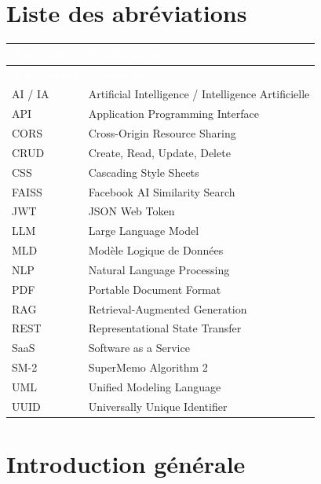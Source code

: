 \documentclass[12pt, a4paper, oneside]{report}
\newcommand{\thead}[1]{\textcolor{white}{\textbf{#1}}}
\begin{document}
\chapter*{Liste des abréviations}
\begin{longtable}{@{}ll@{}}
\toprule
\rowcolor{eduai-primary}
\thead{Abréviation} & \thead{Signification} \\
\midrule
\endfirsthead
\toprule
\rowcolor{eduai-primary}
\thead{Abréviation} & \thead{Signification} \\
\midrule
\endhead
AI / IA & Artificial Intelligence / Intelligence Artificielle \\
API & Application Programming Interface \\
CORS & Cross-Origin Resource Sharing \\
CRUD & Create, Read, Update, Delete \\
CSS & Cascading Style Sheets \\
FAISS & Facebook AI Similarity Search \\
JWT & JSON Web Token \\
LLM & Large Language Model \\
MLD & Modèle Logique de Données \\
NLP & Natural Language Processing \\
PDF & Portable Document Format \\
RAG & Retrieval-Augmented Generation \\
REST & Representational State Transfer \\
SaaS & Software as a Service \\
SM-2 & SuperMemo Algorithm 2 \\
UML & Unified Modeling Language \\
UUID & Universally Unique Identifier \\
\bottomrule
\end{longtable}
\newpage

\hypersetup{pageanchor=true}
\setcounter{page}{1}

\chapter*{Introduction générale}

\end{document}
